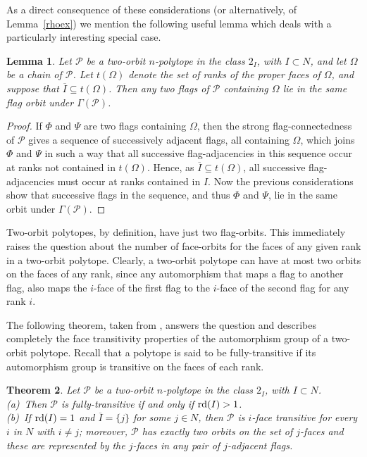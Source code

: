 \documentclass[12pt]{article}
\renewcommand{\bar}{\overline}
\renewcommand{\>}{\rangle}
\newtheorem{theorem}{Theorem}[section]
\newtheorem{lemma}[theorem]{Lemma}
\theoremstyle{definition}\newtheorem{definition}{Definition}[section]
\begin{document}
As a direct consequence of these considerations (or alternatively, of Lemma~\ref{rhoex}) we mention the following useful lemma which deals with a particularly interesting special case. 

\begin{lemma}
\label{omegaorb}
Let $\mathcal{P}$ be a two-orbit $n$-polytope in the class $2_I$, with $I\subset N$, and let $\Omega$ be a chain of $\mathcal{P}$. Let $t(\Omega)$ denote the set of ranks of the proper faces of $\Omega$, and suppose that $\bar{I}\subseteq t(\Omega)$. Then any two flags of $\mathcal{P}$ containing $\Omega$ lie in the same flag orbit under $\Gamma(\mathcal{P})$.
\end{lemma}

\begin{proof}
If $\Phi$ and $\Psi$ are two flags containing $\Omega$, then the strong flag-connectedness of $\mathcal{P}$ gives a sequence of successively adjacent flags, all containing $\Omega$, which joins $\Phi$ and $\Psi$ in such a way that all successive flag-adjacencies in this sequence occur at ranks not contained in $t(\Omega)$. Hence, as $\bar{I}\subseteq t(\Omega)$, all successive flag-adjacencies must occur at ranks contained in $I$. Now the previous considerations show that successive flags in the sequence, and thus $\Phi$ and $\Psi$, lie in the same orbit under $\Gamma(\mathcal{P})$.
\end{proof}

Two-orbit polytopes, by definition, have just two flag-orbits. This immediately raises the question about the number of face-orbits for the faces of any given rank in a two-orbit polytope. Clearly, a two-orbit polytope can have at most two orbits on the faces of any rank, since any automorphism that maps a flag to another flag, also maps the $i$-face of the first flag to the $i$-face of the second flag for any rank $i$. 

The following theorem, taken from \cite{H2010}, answers the question and describes completely the face transitivity properties of the automorphism group of a two-orbit polytope. Recall that a polytope is said to be fully-transitive if its automorphism group is transitive on the faces of each rank.

\begin{theorem}
\label{almost-fully-transitive}
Let $\mathcal{P}$ be a two-orbit $n$-polytope in the class $2_I$, with $I \subset N$. \\[.02in]
(a)\ Then $\mathcal{P}$ is fully-transitive if and only if ${\rm rd}(I)>1$. \\[.02in]
(b)\ If ${\rm rd}(I)=1$ and $\bar{I} = \{j\}$ for some $j\in N$, then $\mathcal{P}$ is $i$-face transitive for every $i$ in $N$ with $i \neq j$; moreover, $\mathcal{P}$ has exactly two orbits on the set of $j$-faces and these are represented by the $j$-faces in any pair of $j$-adjacent flags.
\end{theorem}
\end{document}
